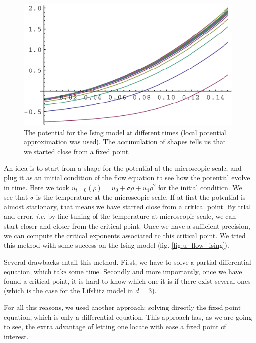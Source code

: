 \begin{figure}[htp]
\begin{center}
\includegraphics[scale=0.6]{img/chap4/u_flow_ising.pdf}
\caption{The potential for the Ising model at different times (local potential approximation was used). The accumulation of shapes tells us that we started close from a fixed point.}
\label{fig:u_flow_ising}
\end{center}
\end{figure}

An idea is to start from a shape for the potential at the microscopic scale, and plug it as an initial condition of the flow equation to see how the potential evolve in time. Here we took $u_{t=0}(\rho) = u_0 + \sigma \rho + u_4 \rho^2$ for the initial condition. We see that $\sigma$ is the temperature at the microscopic scale.
If at first the potential is almost stationary, that means we have started close from a critical point.
 By trial and error, \textit{i.e.} by fine-tuning of the temperature at microscopic scale, we can start closer and closer from the critical point. Once we have a sufficient precision, we can compute the critical exponents associated to this critical point. We tried this method with some success on the Ising model (fig. \eqref{fig:u_flow_ising}).
 
Several drawbacks entail this method. First, we have to solve a partial differential equation, which take some time. Secondly and more importantly, once we have found a critical point, it is hard to know which one it is if there exist several ones (which is the case for the Lifshitz model in $d = 3$).

For all this reasons, we used another approach: solving directly the fixed point equation, which is only a differential equation. This approach has, as we are going to see, the extra advantage of letting one locate with ease a fixed point of interest.

